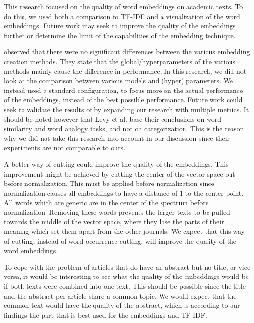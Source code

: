 \documentclass[../../Thesis.tex]{subfiles}
\begin{document}
This research focused on the quality of word embeddings on academic texts. To do this, we used both a comparison to TF-IDF and a visualization of the word embeddings. Future work may seek to improve the quality of the embeddings further or determine the limit of the capabilities of the embedding technique. 

\citet{levy2015improving} observed that there were no significant differences between the various embedding creation methods. They state that the global/hyperparameters of the various methods mainly cause the difference in performance. In this research, we did not look at the comparison between various models and (hyper) parameters. We instead used a standard configuration, to focus more on the actual performance of the embeddings, instead of the best possible performance. Future work could seek to validate the results of \citet{levy2015improving} by expanding our research with multiple metrics. It should be noted however that Levy et al. base their conclusions on word similarity and word analogy tasks, and not on categorization. This is the reason why we did not take this research into account in our discussion since their experiments are not comparable to ours.

A better way of cutting could improve the quality of the embeddings. This improvement might be achieved by cutting the center of the vector space out before normalization. This must be applied before normalization since normalization causes all embeddings to have a distance of 1 to the center point. All words which are generic are in the center of the spectrum before normalization. Removing these words prevents the larger texts to be pulled towards the middle of the vector space, where they lose the parts of their meaning which set them apart from the other journals. We expect that this way of cutting, instead of word-occurrence cutting, will improve the quality of the word embeddings.

To cope with the problem of articles that do have an abstract but no title, or vice versa, it would be interesting to see what the quality of the embeddings would be if both texts were combined into one text. This should be possible since the title and the abstract per article share a common topic. We would expect that the common text would have the quality of the abstract, which is according to our findings the part that is best used for the embeddings and TF-IDF.
\end{document}
